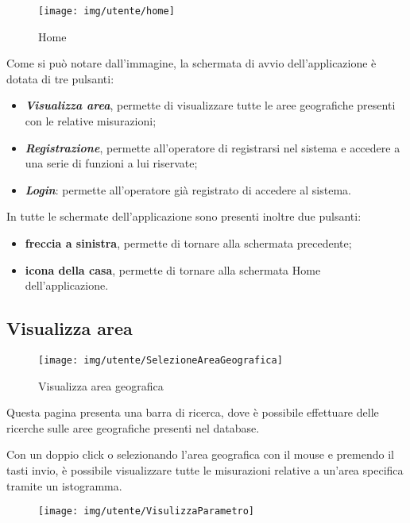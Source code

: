 \begin{figure}[h]
	\centering
	\texttt{[image: img/utente/home]}
	\caption{Home}
	\label{fig:home}
\end{figure}

Come si può notare dall'immagine, la schermata di avvio dell'applicazione è dotata di tre pulsanti:
\begin{itemize}
	\item \textbf{\textit{Visualizza area}}, permette di visualizzare tutte le aree geografiche presenti con le relative misurazioni;
	\item \textbf{\textit{Registrazione}}, permette all'operatore di registrarsi nel sistema e accedere a una serie di funzioni a lui riservate;
	\item \textbf{\textit{Login}}: permette all'operatore già registrato di accedere al sistema. 
\end{itemize}
In tutte le schermate dell'applicazione sono presenti inoltre due pulsanti:
\begin{itemize}
	\item \textbf{freccia a sinistra}, permette di tornare alla schermata precedente;
	\item \textbf{icona della casa}, permette di tornare alla schermata Home dell'applicazione.
\end{itemize}

\subsection{Visualizza area}\label{VisualizzaArea}

\begin{figure}[h]
	\centering
	\texttt{[image: img/utente/SelezioneAreaGeografica]}
	\caption{Visualizza area geografica}
	\label{fig:selezioneareageografica}
\end{figure}

Questa pagina presenta una barra di ricerca, dove è possibile effettuare delle ricerche sulle aree geografiche presenti nel database.

\pagebreak

Con un doppio click o selezionando l'area geografica con il mouse e premendo il tasti invio, è possibile visualizzare tutte le misurazioni relative a un'area specifica tramite un istogramma.

\begin{figure}[h]
	\centering
	\texttt{[image: img/utente/VisulizzaParametro]}
	\caption{}
	\label{fig:visulizzaparametro}
\end{figure}

